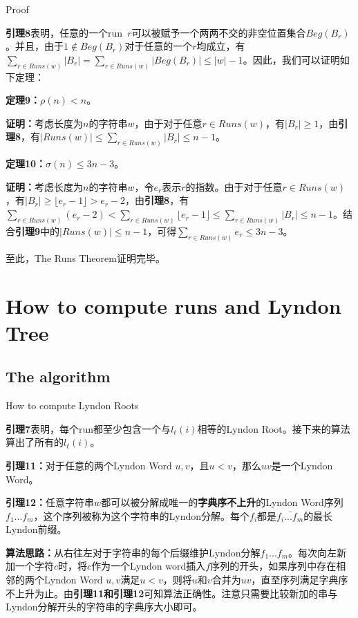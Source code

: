 \documentclass{beamer}
\begin{document}
\begin{frame}{Proof}
    \par \textbf{引理8}表明，任意的一个run\ $r$可以被赋予一个两两不交的非空位置集合$Beg(B_r)$。并且，由于$1\notin Beg(B_r)$对于任意的一个$r$均成立，有$\sum_{r\in Runs(w)}|B_r|=\sum_{r\in Runs(w)}|Beg(B_r)|\leq |w|-1$。因此，我们可以证明如下定理：
	\pause
    \par \textbf{定理9：}$\rho(n)<n$。
	\pause
	\par \textbf{证明：}考虑长度为$n$的字符串$w$，由于对于任意$r\in Runs(w)$，有$|B_r|\geq1$，由\textbf{引理8}，有$|Runs(w)|\leq\sum_{r\in Runs(w)}|B_r|\leq n-1$。
	\par \textbf{定理10：}$\sigma(n)\leq3n-3$。
	\pause
	\par \textbf{证明：}考虑长度为$n$的字符串$w$，令$e_r$表示$r$的指数。由于对于任意$r\in Runs(w)$，有$|B_r|\geq \lfloor e_r-1\rfloor>e_r-2$，由\textbf{引理8}，有$\sum_{r\in Runs(w)}(e_r-2)<\sum_{r\in Runs(w)}\lfloor e_r-1\rfloor\leq\sum_{r\in Runs(w)}|B_r|\leq n-1$。结合\textbf{引理9}中的$|Runs(w)|\leq n-1$，可得$\sum_{r\in Runs(w)}e_r\leq3n-3$。
	\pause
	\par 至此，The Runs Theorem证明完毕。
\end{frame}

\section{How to compute runs and Lyndon Tree}

\subsection{The algorithm}
\begin{frame}{How to compute Lyndon Roots}
	\par \textbf{引理7}表明，每个run都至少包含一个与$l_{\ell}(i)$相等的Lyndon Root。接下来的算法算出了所有的$l_{\ell}(i)$。
	\pause
	\par \textbf{引理11：}对于任意的两个Lyndon Word $u,v$，且$u<v$，那么$uv$是一个Lyndon Word。
	\pause
	\par \textbf{引理12：}任意字符串$w$都可以被分解成唯一的\textbf{字典序不上升}的Lyndon Word序列$f_1...f_m$，这个序列被称为这个字符串的Lyndon分解。每个$f_i$都是$\overline{f_i...f_m}$的最长Lyndon前缀。
	\pause
	\par \textbf{算法思路：}从右往左对于字符串的每个后缀维护Lyndon分解$f_1...f_m$。每次向左新加一个字符$c$时，将$c$作为一个Lyndon word插入$f$序列的开头，如果序列中存在相邻的两个Lyndon Word $u, v$满足$u<v$，则将$u$和$v$合并为$uv$，直至序列满足字典序不上升为止。由\textbf{引理11和引理12}可知算法正确性。注意只需要比较新加的串与Lyndon分解开头的字符串的字典序大小即可。
	
\end{frame}
\end{document}
